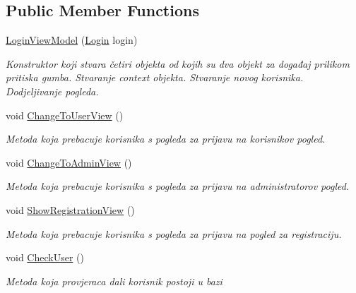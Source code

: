 \subsection*{Public Member Functions}
\begin{DoxyCompactItemize}
\item 
\mbox{\hyperlink{class_easy_library_application_1_1_w_p_f_1_1_view_model_1_1_login_view_model_a2a9bd8a176cd17791935f2f3ed06b38c}{Login\+View\+Model}} (\mbox{\hyperlink{class_easy_library_application_1_1_w_p_f_1_1_view_1_1_login}{Login}} login)
\begin{DoxyCompactList}\small\item\em Konstruktor koji stvara četiri objekta od kojih su dva objekt za događaj prilikom pritiska gumba. Stvaranje context objekta. Stvaranje novog korisnika. Dodjeljivanje pogleda. \end{DoxyCompactList}\item 
void \mbox{\hyperlink{class_easy_library_application_1_1_w_p_f_1_1_view_model_1_1_login_view_model_af515d26dff01cc8a0a8db4695eced767}{Change\+To\+User\+View}} ()
\begin{DoxyCompactList}\small\item\em Metoda koja prebacuje korisnika s pogleda za prijavu na korisnikov pogled. \end{DoxyCompactList}\item 
void \mbox{\hyperlink{class_easy_library_application_1_1_w_p_f_1_1_view_model_1_1_login_view_model_ac7ef3aa4c44e225fda617e58015f085e}{Change\+To\+Admin\+View}} ()
\begin{DoxyCompactList}\small\item\em Metoda koja prebacuje korisnika s pogleda za prijavu na administratorov pogled. \end{DoxyCompactList}\item 
void \mbox{\hyperlink{class_easy_library_application_1_1_w_p_f_1_1_view_model_1_1_login_view_model_a18236d8222050949019144299c572897}{Show\+Registration\+View}} ()
\begin{DoxyCompactList}\small\item\em Metoda koja prebacuje korisnika s pogleda za prijavu na pogled za registraciju. \end{DoxyCompactList}\item 
void \mbox{\hyperlink{class_easy_library_application_1_1_w_p_f_1_1_view_model_1_1_login_view_model_a0eccbbb7026ba1e6987d2893aade2533}{Check\+User}} ()
\begin{DoxyCompactList}\small\item\em Metoda koja provjeraca dali korisnik postoji u bazi \end{DoxyCompactList}\end{DoxyCompactItemize}
